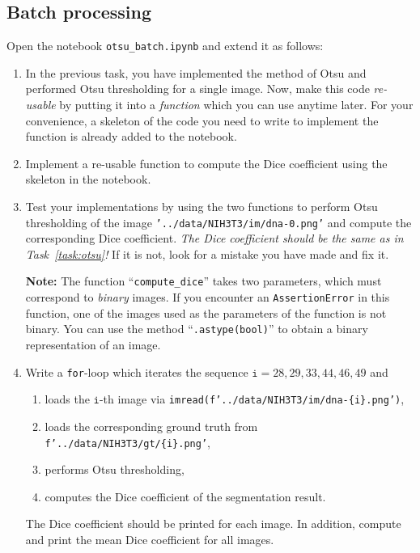 \documentclass[12pt,a4paper]{article}
\begin{document}
\begin{samepage}
\section{Batch processing}
\label{task:otsu_batch}

Open the notebook \texttt{otsu\_batch.ipynb} and extend it as follows:

\begin{enumerate}
    \item In the previous task, you have implemented the method of Otsu and performed Otsu thresholding for a single image. Now, make this code \emph{re-usable} by putting it into a \emph{function} which you can use anytime later. For your convenience, a skeleton of the code you need to write to implement the function is already added to the notebook.
    \item Implement a re-usable function to compute the Dice coefficient using the skeleton in the notebook.
    \item Test your implementations by using the two functions to perform Otsu thresholding of the image \texttt{'../data/NIH3T3/im/dna-0.png'} and compute the corresponding Dice coefficient. \emph{The Dice coefficient should be the same as in Task~\ref{task:otsu}!} If it is not, look for a mistake you have made and fix it.

    \textbf{Note:} The function ``\texttt{compute\_dice}'' takes two parameters, which must correspond to \emph{binary} images. If you encounter an \texttt{AssertionError} in this function, one of the images used as the parameters of the function is not binary. You can use the method ``\texttt{.astype(bool)}'' to obtain a binary representation of an image.
    
    \item Write a \texttt{for}-loop which iterates the sequence $\texttt{i} = 28,29,33,44,46,49$ and
    \begin{enumerate}
        \item loads the $\texttt{i}$-th image via \texttt{imread(f'../data/NIH3T3/im/dna-\{i\}.png')},
        \item loads the corresponding ground truth from \texttt{f'../data/NIH3T3/gt/\{i\}.png'},
        \item performs Otsu thresholding,
        \item computes the Dice coefficient of the segmentation result.
    \end{enumerate}
    The Dice coefficient should be printed for each image. In addition, compute and print the mean Dice coefficient for all images.
\end{enumerate}
\end{samepage}
\end{document}
